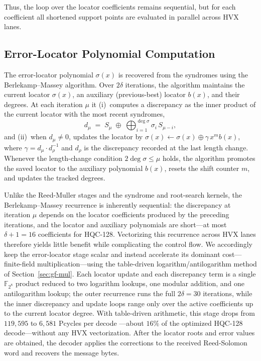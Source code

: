 \documentclass[12pt,a4paper]{report}
\begin{document}
Thus, the loop over the locator coefficients remains sequential, but for each
coefficient all shortened support points are evaluated in parallel across HVX
lanes.

\subsection{Error-Locator Polynomial Computation}
The error-locator polynomial $\sigma(x)$ is recovered from the syndromes using the
Berlekamp--Massey algorithm. Over $2\delta$ iterations, the algorithm
maintains the current locator $\sigma(x)$, an auxiliary (previous-best) locator
$b(x)$, and their degrees. At each iteration $\mu$ it (i)~computes a discrepancy as
the inner product of the current locator with the most recent syndromes,
\[
  d_\mu \;=\; S_\mu \;\oplus\; \bigoplus_{i=1}^{\deg \sigma} \sigma_i\, S_{\mu-i},
\]
and (ii)~when $d_\mu \neq 0$, updates the locator by
$\sigma(x) \leftarrow \sigma(x) \oplus \gamma\, x^{m} b(x)$, where
$\gamma = d_\mu \cdot d_\rho^{-1}$ and $d_\rho$ is the discrepancy recorded at the
last length change. Whenever the length-change condition $2\deg\sigma \le \mu$ holds,
the algorithm promotes the saved locator to the auxiliary polynomial $b(x)$, resets
the shift counter $m$, and updates the tracked degrees.

Unlike the Reed-Muller stages and the syndrome and root-search kernels, the
Berlekamp--Massey recurrence is inherently sequential: the discrepancy at iteration
$\mu$ depends on the locator coefficients produced by the preceding iterations, and
the locator and auxiliary polynomials are short---at most $\delta+1 = 16$ coefficients
for HQC-128. Vectorizing this recurrence across HVX lanes therefore yields little
benefit while complicating the control flow. We accordingly keep the error-locator
stage scalar and instead accelerate its dominant cost---finite-field
multiplication---using the table-driven logarithm/antilogarithm method of
Section~\ref{sec:gf-mul}. Each locator update and each discrepancy
term is a single $\mathbb{F}_{2^8}$ product reduced to two logarithm lookups, one
modular addition, and one antilogarithm lookup; the outer recurrence runs the full
$2\delta = 30$ iterations, while the inner discrepancy and update loops range only
over the active coefficients up to the current locator degree. With table-driven
arithmetic, this stage drops from $119{,}595$ to $6{,}581$ Pcycles per decode
---about $16\%$ of the optimized HQC-128 decode---without
any HVX vectorization. After the locator roots and error values are obtained, the decoder applies the corrections to the received Reed-Solomon word and recovers the message bytes.
\end{document}
